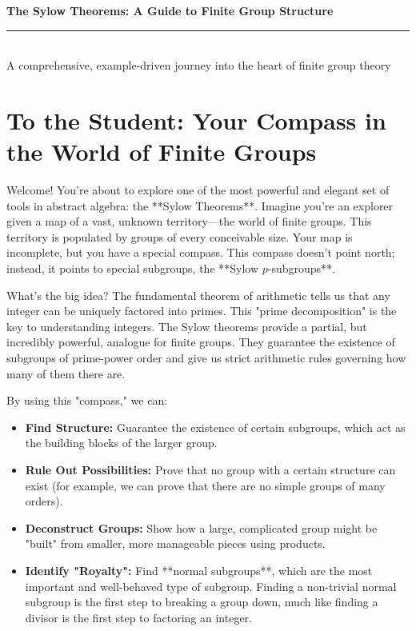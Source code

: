 \documentclass[12pt,a4paper]{article}
\theoremstyle{plain} %
\theoremstyle{definition} %
\theoremstyle{remark} %
\begin{document}
\begin{center}
  {\Huge\bfseries The Sylow Theorems: A Guide to Finite Group Structure}\\[-2pt]
  \rule{0.95\textwidth}{1.2pt}\\[4pt]
  {\Large A comprehensive, example-driven journey into the heart of finite group theory}
\end{center}

\section*{To the Student: Your Compass in the World of Finite Groups}

Welcome! You're about to explore one of the most powerful and elegant set of tools in abstract algebra: the **Sylow Theorems**. Imagine you're an explorer given a map of a vast, unknown territory—the world of finite groups. This territory is populated by groups of every conceivable size. Your map is incomplete, but you have a special compass. This compass doesn't point north; instead, it points to special subgroups, the **Sylow $p$-subgroups**.

What's the big idea? The fundamental theorem of arithmetic tells us that any integer can be uniquely factored into primes. This "prime decomposition" is the key to understanding integers. The Sylow theorems provide a partial, but incredibly powerful, analogue for finite groups. They guarantee the existence of subgroups of prime-power order and give us strict arithmetic rules governing how many of them there are.

By using this "compass," we can:
\begin{itemize}[label=\textbf{--}]
  \item \textbf{Find Structure:} Guarantee the existence of certain subgroups, which act as the building blocks of the larger group.
  \item \textbf{Rule Out Possibilities:} Prove that no group with a certain structure can exist (for example, we can prove that there are no simple groups of many orders).
  \item \textbf{Deconstruct Groups:} Show how a large, complicated group might be "built" from smaller, more manageable pieces using products.
  \item \textbf{Identify "Royalty":} Find **normal subgroups**, which are the most important and well-behaved type of subgroup. Finding a non-trivial normal subgroup is the first step to breaking a group down, much like finding a divisor is the first step to factoring an integer.
\end{itemize}
\end{document}

